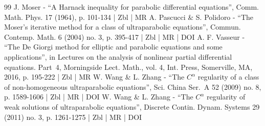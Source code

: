 \begin{thebibliography}{99}
J. Moser - “A Harnack inequality for parabolic differential equations”, Comm. Math. Phys. 17 (1964), p. 101-134 | Zbl | MR
A. Pascucci \& S. Polidoro - “The Moser’s iterative method for a class of ultraparabolic equations”, Commun. Contemp. Math. 6 (2004) no. 3, p. 395-417 | Zbl | MR | DOI
A. F. Vasseur - “The De Giorgi method for elliptic and parabolic equations and some applications”, in Lectures on the analysis of nonlinear partial differential equations. Part 4, Morningside Lect. Math., vol. 4, Int. Press, Somerville, MA, 2016, p. 195-222 | Zbl | MR
W. Wang \& L. Zhang - “The $C^\alpha $ regularity of a class of non-homogeneous ultraparabolic equations”, Sci. China Ser. A 52 (2009) no. 8, p. 1589-1606 | Zbl | MR | DOI
W. Wang \& L. Zhang - “The $C^\alpha $ regularity of weak solutions of ultraparabolic equations”, Discrete Contin. Dynam. Systems 29 (2011) no. 3, p. 1261-1275 | Zbl | MR | DOI
\end{thebibliography}
